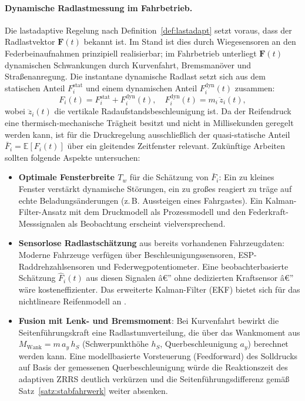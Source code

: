 ﻿\documentclass[a4paper,12pt]{article}
\theoremstyle{definition}
\begin{document}
\paragraph{Dynamische Radlastmessung im Fahrbetrieb.}
Die lastadaptive Regelung nach Definition~\ref{def:lastadapt} setzt voraus,
dass der Radlastvektor $\mathbf{F}(t)$ bekannt ist. Im Stand ist dies durch
Wiegesensoren an den Federbeinaufnahmen prinzipiell realisierbar; im
Fahrbetrieb unterliegt $\mathbf{F}(t)$ dynamischen Schwankungen durch
Kurvenfahrt, Bremsmanöver und Straßenanregung. Die instantane dynamische
Radlast setzt sich aus dem statischen Anteil $F^{\text{stat}}_i$ und einem
dynamischen Anteil $F^{\text{dyn}}_i(t)$ zusammen:
\[
    F_i(t) = F^{\text{stat}}_i + F^{\text{dyn}}_i(t),
    \quad
    F^{\text{dyn}}_i(t) = m_i\,\ddot{z}_i(t),
\]
wobei $\ddot{z}_i(t)$ die vertikale Radaufstandsbeschleunigung ist.
Da der Reifendruck eine thermisch-mechanische Trägheit besitzt und nicht
in Millisekunden geregelt werden kann, ist für die
Druckregelung ausschließlich der quasi-statische Anteil
$\bar{F}_i = \mathbb{E}[F_i(t)]$ über ein gleitendes Zeitfenster relevant.
Zukünftige Arbeiten sollten folgende Aspekte untersuchen:
\begin{itemize}
    \item \textbf{Optimale Fensterbreite $T_w$} für die Schätzung von
    $\bar{F}_i$: Ein zu kleines Fenster verstärkt dynamische Störungen,
    ein zu großes reagiert zu träge auf echte Beladungsänderungen
    (z.\,B. Aussteigen eines Fahrgastes). Ein Kalman-Filter-Ansatz
    \cite{kalman1960} mit dem Druckmodell als Prozessmodell und den
    Federkraft-Messsignalen als Beobachtung erscheint vielversprechend.
    \item \textbf{Sensorlose Radlastschätzung} aus bereits vorhandenen
    Fahrzeugdaten: Moderne Fahrzeuge verfügen über Beschleunigungssensoren,
    ESP-Raddrehzahlsensoren und Federwegpotentiometer. Eine beobachterbasierte
    Schätzung $\hat{F}_i(t)$ aus diesen Signalen â€” ohne dedizierten
    Kraftsensor â€” wäre kosteneffizienter. Das erweiterte Kalman-Filter (EKF)
    bietet sich für das nichtlineare Reifenmodell an \cite{rajamani}.
    \item \textbf{Fusion mit Lenk- und Bremsmoment}: Bei Kurvenfahrt
    bewirkt die Seiten\-führungs\-kraft eine Radlastumverteilung, die über
    das Wankmoment aus $M_{\text{Wank}} = m\,a_y\,h_S$ (Schwerpunkthöhe $h_S$,
    Querbeschleunigung $a_y$) berechnet werden kann. Eine modellbasierte
    Vorsteuerung (Feedforward) des Solldrucks auf Basis der
    gemessenen Querbeschleunigung würde die Reaktionszeit des adaptiven
    ZRRS deutlich verkürzen und die Seitenführungsdifferenz gemäß
    Satz~\ref{satz:stabfahrwerk} weiter absenken.
\end{itemize}
\end{document}
